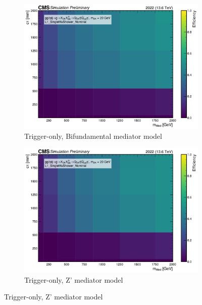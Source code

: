 \begin{figure}[h]
  \centering

  \begin{subfigure}[t]{0.45\textwidth}
    \centering
    \includegraphics[width=\linewidth]{images/L1/llp_2D_tchan/trigeffplots2D_L1_efftype-trig_t-channel_mDark-20_L1_SingleMuShower_Nominal_study_cloppear.pdf}
    \caption{Trigger-only, Bifundamental mediator model}
    \label{fig:mus_trig_tchan}
  \end{subfigure}
  \hfill
  \begin{subfigure}[t]{0.45\textwidth}
    \centering
    \includegraphics[width=\linewidth]{images/L1/llp_2D_schan/trigeffplots2D_L1_efftype-trig_s-channel_mDark-20_L1_SingleMuShower_Nominal_study_cloppear.pdf}
    \caption{Trigger-only, Z' mediator model}
    \label{fig:mus_trig_schan}
  \end{subfigure}


\end{figure}
